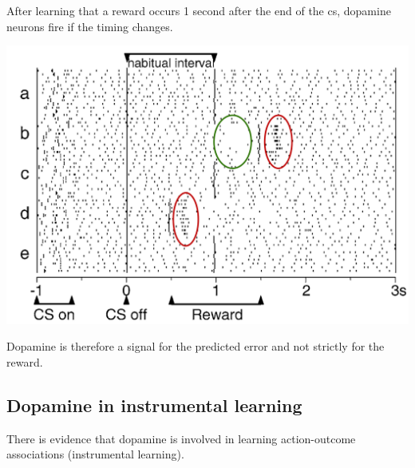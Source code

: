 \begin{description}
        \begin{@empty}
            \small
            \begin{example}
                After learning that a reward occurs 1 second after the end of the \ac{cs}, 
                dopamine neurons fire if the timing changes.
                \begin{center}
                    \includegraphics[width=0.5\linewidth]{./img/dopamine_timing.png}
                \end{center}
            \end{example}
        \end{@empty}
\end{description}

\begin{remark}
    Dopamine is therefore a signal for the predicted error and not strictly for the reward.
\end{remark}


\subsection{Dopamine in instrumental learning}

There is evidence that dopamine is involved in learning action-outcome associations (instrumental learning).

